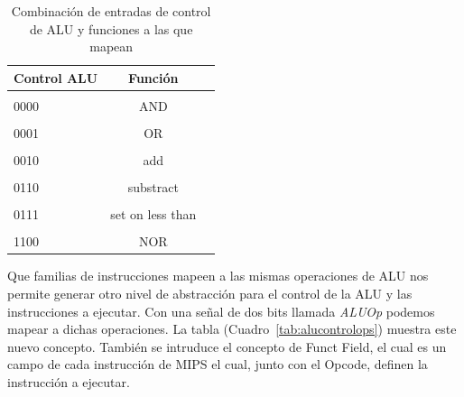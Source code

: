 \documentclass[12pt]{article}
\begin{document}
\begin{table}[!ht]
\centering
\caption{Combinación de entradas de control de ALU y funciones a las que mapean}
\label{tab:alucontrol}
\smallskip
\begin{tabular}{l c c}
\hline
Control ALU & Función \\[0.5ex]
\hline
&&\\[-2ex]
0000 & AND \\[0.5ex]
\hline
&&\\[-2ex]
0001 & OR\\[0.5ex]
\hline
&&\\[-2ex]
0010 & add\\[0.5ex]
\hline
&&\\[-2ex]
0110 & substract\\[0.5ex]
\hline
&&\\[-2ex]
0111 & set on less than\\[0.5ex]
\hline
&&\\[-2ex]
1100 & NOR\\[0.5ex]
\hline
\end{tabular}
\end{table}

Que familias de instrucciones mapeen a las mismas operaciones de ALU nos permite generar otro nivel de abstracción para el control de la ALU y las instrucciones a ejecutar. Con una señal de dos bits llamada \textit{ALUOp} podemos mapear a dichas operaciones. La tabla (Cuadro~\ref{tab:alucontrolops}) muestra este nuevo concepto. También se intruduce el concepto de Funct Field, el cual es un campo de cada instrucción de MIPS el cual, junto con el Opcode, definen la instrucción a ejecutar.
\end{document}
